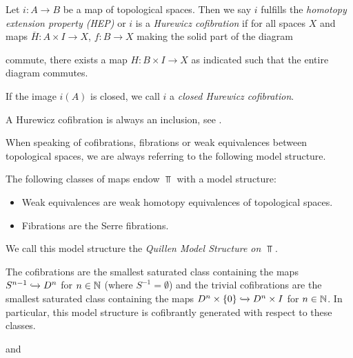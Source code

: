\begin{definition}
    Let $i\colon A\to B$ be a map of topological spaces.
    Then we say $i$ fulfills the \emph{homotopy extension property (HEP)} or $i$ is a \emph{Hurewicz cofibration} if for all spaces $X$ and maps $\overline{H}\colon A\times I\to X$, $f\colon B\to X$ making the solid part of the diagram 
    \begin{center}
    \end{center}
    commute, there exists a map $H\colon B\times I\to X$ as indicated such that the entire diagram commutes.
    
    If the image $i(A)$ is closed, we call $i$ a \emph{closed Hurewicz cofibration}.
\end{definition}
\begin{remark}\label{rmk:hurewiczCofibIsIncl}
    A Hurewicz cofibration is always an inclusion, see \cite[Theorem 1]{note_on_cofibs_1}.
\end{remark}
When speaking of cofibrations, fibrations or weak equivalences between topological spaces, we are always referring to the following model structure.
\begin{thm}
    The following classes of maps endow $\Top$ with a model structure:
    \begin{itemize}
        \item Weak equivalences are weak homotopy equivalences of topological spaces.
        \item Fibrations are the Serre fibrations.
    \end{itemize}
    We call this model structure the \emph{Quillen Model Structure on $\Top$}.
    
    The cofibrations are the smallest saturated class containing the maps $S^{n-1}\xhookrightarrow{}D^n$ for $n\in\mathbb{N}$ (where $S^{-1}=\emptyset$) and the trivial cofibrations are the smallest saturated class containing the maps $D^n\times\left\lbrace0\right\rbrace\xhookrightarrow{}D^n\times I$ for $n\in\mathbb{N}$.
    In particular, this model structure is cofibrantly generated with respect to these classes.
    \begin{reference}
        \cite[Chap. II, \S 3, Theorem 1]{Quillen1967} and \cite{hirschhorn_quillen}
    \end{reference}
\end{thm}
